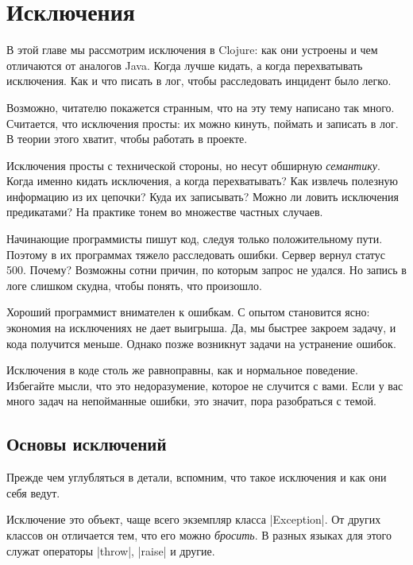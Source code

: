 \chapter{Исключения}

\begin{teaser}
В этой главе мы рассмотрим исключения в Clojure: как они устроены и чем
отличаются от аналогов Java. Когда лучше кидать, а когда перехватывать
исключения. Как и что писать в лог, чтобы расследовать инцидент было легко.
\end{teaser}

Возможно, читателю покажется странным, что на эту тему написано так
много. Считается, что исключения просты: их можно кинуть, поймать и записать в
лог. В теории этого хватит, чтобы работать в проекте.

Исключения просты с технической стороны, но несут обширную
\emph{семантику}. Когда именно кидать исключения, а когда перехватывать? Как
извлечь полезную информацию из их цепочки? Куда их записывать? Можно ли ловить
исключения предикатами? На практике тонем во множестве частных случаев.

Начинающие программисты пишут код, следуя только положительному пути. Поэтому в
их программах тяжело расследовать ошибки. Сервер вернул статус 500. Почему?
Возможны сотни причин, по которым запрос не удался. Но запись в логе слишком
скудна, чтобы понять, что произошло.

Хороший программист внимателен к ошибкам. С опытом становится ясно: экономия на
исключениях не дает выигрыша. Да, мы быстрее закроем задачу, и кода получится
меньше. Однако позже возникнут задачи на устранение ошибок.

Исключения в коде столь же равноправны, как и нормальное поведение. Избегайте
мысли, что это недоразумение, которое не случится с вами. Если у вас много задач
на непойманные ошибки, это значит, пора разобраться с темой.

\section{Основы исключений}

Прежде чем углубляться в детали, вспомним, что такое исключения и как они себя
ведут.

Исключение это объект, чаще всего экземпляр класса \spverb|Exception|. От других
классов он отличается тем, что его можно \emph{бросить}. В разных языках для
этого служат операторы \spverb|throw|, \spverb|raise| и другие.

